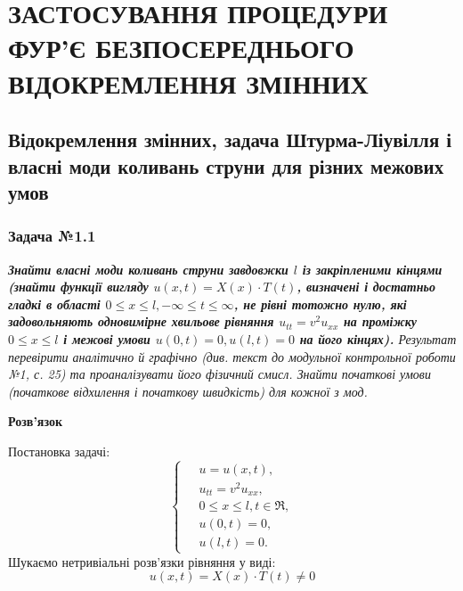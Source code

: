 \documentclass[a4paper, 12pt]{extreport}
\begin{document}
\tableofcontents
\setcounter{page}{2}

\chapter{ЗАСТОСУВАННЯ ПРОЦЕДУРИ ФУР’Є
БЕЗПОСЕРЕДНЬОГО ВІДОКРЕМЛЕННЯ ЗМІННИХ}

\section{Відокремлення змінних, задача Штурма-Ліувілля і власні моди коливань струни для різних межових умов}

\subsection*{Задача №1.1}

\textit{\textbf{Знайти власні моди коливань струни завдовжки $l$ із закріпленими кінцями (знайти функції вигляду $u(x,t) = X(x) \cdot T(t)$, визначені і достатньо гладкі в області $0 \leq x \leq l, -\infty \leq t \leq \infty$, не рівні тотожно нулю, які задовольняють одновимірне хвильове рівняння $u_{tt} = v^2 u_{xx}$ на проміжку $0 \leq x \leq l$ і межові умови $u(0,t) = 0, u(l,t) = 0$ на його кінцях).} Результат перевірити аналітично й графічно (див. текст до модульної контрольної роботи №1, с. 25) та проаналізувати його фізичний смисл. Знайти початкові умови (початкове відхилення і початкову швидкість) для кожної з мод.}

\begin{center}
    \large{\textbf{Розв'язок}}
\end{center}
Постановка задачі:
\begin{equation}
    \left\{ \begin{aligned} %
        \;&u = u(x,t), \\  &u_{tt} = v^2 u_{xx}, \\ &0 \leq x \leq l, t \in \Re, \\  &u(0,t) = 0, \\ &u(l,t) = 0. 
    \end{aligned} \right.
\end{equation}
Шукаємо нетривіальні розв'язки рівняння у виді:
\begin{equation} \label{subst}
    u(x,t) = X(x) \cdot T(t) \neq 0 
\end{equation}
\end{document}
